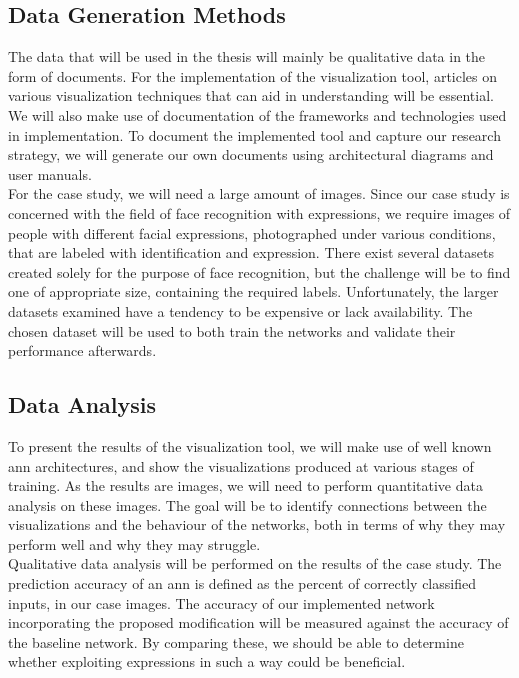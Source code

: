 \subsection{Data Generation Methods} \label{sec:data-generation-methods}

The data that will be used in the thesis will mainly be qualitative data in the form of documents. For the implementation of the visualization tool, articles on various visualization techniques that can aid in understanding  will be essential. We will also make use of documentation of the frameworks and technologies used in implementation. To document the implemented tool and capture our research strategy, we will generate our own documents using architectural diagrams and user manuals. \\

\noindent For the case study, we will need a large amount of images. Since our case study is concerned with the field of face recognition with expressions, we require images of people with different facial expressions, photographed under various conditions, that are labeled with identification and expression. There exist several datasets created solely for the purpose of face recognition, but the challenge will be to find one of appropriate size, containing the required labels. Unfortunately, the larger datasets examined have a tendency to be expensive or lack availability. The chosen dataset will be used to both train the networks and validate their performance afterwards.

\subsection{Data Analysis}

To present the results of the visualization tool, we will make use of well known \acrshort{ann} architectures, and show the visualizations produced at various stages of training. As the results are images, we will need to perform quantitative data analysis on these images. The goal will be to identify connections between the visualizations and the behaviour of the networks, both in terms of why they may perform well and why they may struggle. \\

\noindent Qualitative data analysis will be performed on the results of the case study. The prediction accuracy of an \acrshort{ann} is defined as the percent of correctly classified inputs, in our case images. The accuracy of our implemented network incorporating the proposed modification will be measured against the accuracy of the baseline network. By comparing these, we should be able to determine whether exploiting expressions in such a way could be beneficial.

